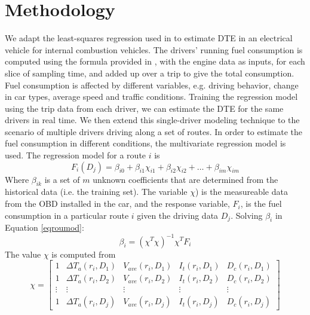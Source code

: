 \section{Methodology}

We adapt the least-squares regression used in \cite{rodgersetal2013} to estimate DTE in an electrical vehicle for internal combustion vehicles. The drivers' running fuel consumption is computed using the formula provided in \cite{lightner2013}, with the engine data as inputs, for each slice of sampling time, and added up over a trip to give the total consumption. Fuel consumption is affected by different variables, e.g. driving behavior, change in car types, average speed and traffic conditions. Training the regression model using the trip data from each driver, we can estimate the DTE for the same drivers in real time.
We then extend this single-driver modeling technique to the scenario of multiple drivers driving along a set of routes.  In order to estimate the fuel consumption in different conditions, the multivariate regression model \cite{freund2006} is used. The regression model for a route \(i\) is
\begin{equation}
F_i(D_j) = \beta_{i0} + \beta_{i1} \chi_{i1} + \beta_{i2} \chi_{i2} + \ldots + \beta_{im} \chi_{im}
\label{eqroumod}
\end{equation}
Where \(\beta_{ik}\) is a set of \(m\) unknown coefficients that are determined from the historical data (i.e. the training set). The variable \(\chi\)) is the measureable data from the OBD installed in the car, and the response variable, \(F_i\), is the fuel consumption in a particular route \(i\) given the driving data \(D_j\).
Solving \(\beta_i\) in Equation \ref{eqroumod}:
\begin{equation}
\beta_i = (\chi^T \chi)^{-1} \chi^T F_i
\label{eqsolbeta}
\end{equation}
The value \(\chi\) is computed from
\begin{equation}
\chi = \begin{bmatrix}
	1 & \Delta T_a(r_i,D_1) & V_{ave}(r_i,D_1) & I_{t}(r_i,D_1) & D_{c}(r_i,D_1) \\[0.3em]
	1 & \Delta T_a(r_i,D_2) & V_{ave}(r_i,D_2) & I_{t}(r_i,D_2) & D_{c}(r_i,D_2) \\[0.3em]
	\vdots & \vdots & \vdots & \vdots & \vdots \\[0.3em]
	1 & \Delta T_a(r_i,D_j) & V_{ave}(r_i,D_j) & I_{t}(r_i,D_j) & D_{c}(r_i,D_j)
	\end{bmatrix}
\label{eqchimatrix}
\end{equation}


